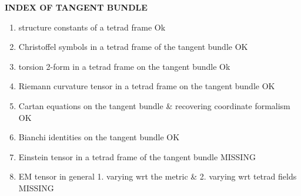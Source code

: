 \noindent
\textbf{INDEX OF TANGENT BUNDLE}
\begin{enumerate}
    \item structure constants of a tetrad frame Ok
    \item Christoffel symbols in a tetrad frame of the tangent bundle OK
    \item torsion 2-form in a tetrad frame on the tangent bundle Ok
    \item Riemann curvature tensor in a tetrad frame on the tangent bundle OK
    \item Cartan equations on the tangent bundle \& recovering coordinate formalism OK
    \item Bianchi identities on the tangent bundle OK
    \item Einstein tensor in a tetrad frame of the tangent bundle {\color{red} MISSING}
    \item EM tensor in general 1. varying wrt the metric \& 2. varying wrt tetrad fields  {\color{red}MISSING}
\end{enumerate}
